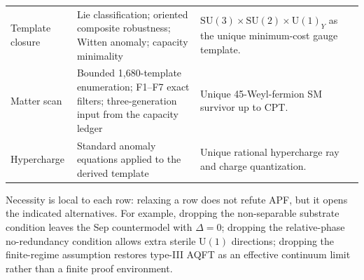 \documentclass[11pt]{article}
\theoremstyle{definition}
\newcommand{\SU}{\mathrm{SU}}
\newcommand{\U}{\mathrm{U}}
\begin{document}
\begin{tcolorbox}[apfbox, title={Axioms-to-SM checklist: minimal load-bearing inputs of the whole program}]
\begin{center}
\begin{tabular}{@{}p{2.3cm}p{5.2cm}p{5.0cm}@{}}
Template closure & Lie classification; oriented composite robustness; Witten anomaly; capacity minimality & $\SU(3)\times\SU(2)\times\U(1)_Y$ as the unique minimum-cost gauge template. \\
Matter scan & Bounded 1{,}680-template enumeration; F1--F7 exact filters; three-generation input from the capacity ledger & Unique 45-Weyl-fermion SM survivor up to CPT. \\
Hypercharge & Standard anomaly equations applied to the derived template & Unique rational hypercharge ray and charge quantization. \\
\bottomrule
\end{tabular}
\end{center}
\smallskip
\noindent
Necessity is local to each row: relaxing a row does not refute APF, but it
opens the indicated alternatives.  For example, dropping the non-separable
substrate condition leaves the Sep countermodel with $\Delta=0$; dropping
the relative-phase no-redundancy condition allows extra sterile $\U(1)$
directions; dropping the finite-regime assumption restores type-III AQFT
as an effective continuum limit rather than a finite proof environment.
\end{tcolorbox}
\end{document}
